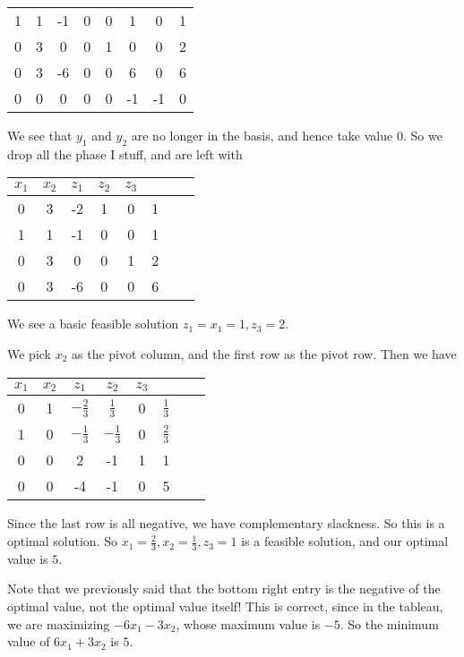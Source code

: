 \documentclass[a4paper]{article}
\begin{document}
\begin{eg}
\begin{center}
\begin{tabular}{cccccccc}
      1 & 1 & -1 & 0 & 0 & 1 & 0 & 1\\
      0 & 3 & 0 & 0 & 1 & 0 & 0 & 2\\
      \midrule
      0 & 3 & -6 & 0 & 0 & 6 & 0 & 6\\
      0 & 0 & 0 & 0 & 0 & -1 & -1 & 0\\
      \bottomrule
    \end{tabular}
  \end{center}
  We see that $y_1$ and $y_2$ are no longer in the basis, and hence take value $0$. So we drop all the phase I stuff, and are left with
  \begin{center}
    \begin{tabular}{cccccccc}
      \toprule
      $x_1$ & $x_2$ & $z_1$ & $z_2$ & $z_3$\\
      \midrule
      0 & 3 & -2 & 1 & 0 & 1\\
      1 & 1 & -1 & 0 & 0 & 1\\
      0 & 3 & 0 & 0 & 1 & 2\\
      \midrule
      0 & 3 & -6 & 0 & 0 & 6\\
      \bottomrule
    \end{tabular}
  \end{center}
  We see a basic feasible solution $z_1 = x_1 = 1, z_3 = 2$.

  We pick $x_2$ as the pivot column, and the first row as the pivot row. Then we have
  \begin{center}
    \begin{tabular}{cccccccc}
      \toprule
      $x_1$ & $x_2$ & $z_1$ & $z_2$ & $z_3$\\
      \midrule
      0 & 1 & $-\frac{2}{3}$ & $\frac{1}{3}$ & 0 & $\frac{1}{3}$\\
      1 & 0 & $-\frac{1}{3}$ & $-\frac{1}{3}$ & 0 & $\frac{2}{3}$\\
      0 & 0 & 2 & -1 & 1 & 1\\
      \midrule
      0 & 0 & -4 & -1 & 0 & 5\\
      \bottomrule
    \end{tabular}
  \end{center}
  Since the last row is all negative, we have complementary slackness. So this is a optimal solution. So $x_1 = \frac{2}{3}, x_2 = \frac{1}{3}, z_3 = 1$ is a feasible solution, and our optimal value is $5$.

  Note that we previously said that the bottom right entry is the negative of the optimal value, not the optimal value itself! This is correct, since in the tableau, we are maximizing $-6x_1 - 3x_2$, whose maximum value is $-5$. So the minimum value of $6x_1 + 3x_2$ is $5$.
\end{eg}
\end{document}

